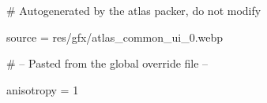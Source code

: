 # Autogenerated by the atlas packer, do not modify

source = res/gfx/atlas_common_ui_0.webp

# -- Pasted from the global override file --

anisotropy = 1
